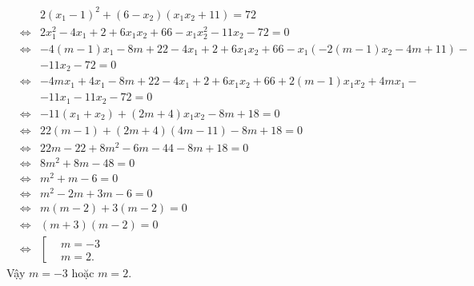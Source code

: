 \begin{bt}
{\begin{enumerate}
			\begin{eqnarray*}
				&&2(x_1-1)^2+(6-x_2)(x_1x_2+11)=72\\
				&\Leftrightarrow & 2x_1^2-4x_1+2+6x_1x_2+66-x_1x_2^2-11x_2-72=0\\
				&\Leftrightarrow & -4(m-1)x_1-8m+22-4x_1+2+6x_1x_2+66-x_1(-2(m-1)x_2-4m+11)-\\
				& &-11x_2-72=0\\
				&\Leftrightarrow & -4mx_1+4x_1-8m+22-4x_1+2+6x_1x_2+66+2(m-1)x_1x_2+4mx_1-\\
				& & -11x_1-11x_2-72=0\\
				&\Leftrightarrow &-11(x_1+x_2)+(2m+4)x_1x_2-8m+18=0\\
				&\Leftrightarrow &22(m-1)+(2m+4)(4m-11)-8m+18=0\\
				&\Leftrightarrow &22m-22 + 8m^2-6m -44-8m +18=0\\
				&\Leftrightarrow & 8m^2+8m-48=0\\
				&\Leftrightarrow & m^2+m-6=0\\
				&\Leftrightarrow & m^2-2m+3m-6=0\\
				&\Leftrightarrow & m(m-2)+3(m-2)=0\\
				&\Leftrightarrow & (m+3)(m-2)=0\\
				&\Leftrightarrow & \left[\begin{aligned} & m=-3 \\ & m=2.\end{aligned}\right.
			\end{eqnarray*}
			Vậy $m=-3$ hoặc $m=2.$
		\end{enumerate}
	
	}
\end{bt}
